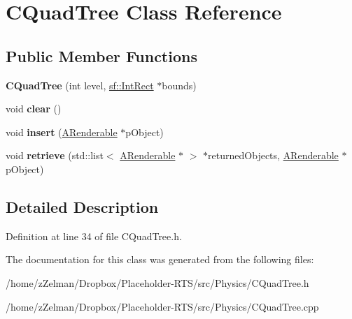 \hypertarget{classCQuadTree}{\section{C\-Quad\-Tree Class Reference}
\label{classCQuadTree}
}
\subsection*{Public Member Functions}
\begin{DoxyCompactItemize}
\item 
\hypertarget{classCQuadTree_a508176d23f4bcb255ca06bf70edce638}{{\bfseries C\-Quad\-Tree} (int level, \hyperlink{classsf_1_1Rect}{sf\-::\-Int\-Rect} $\ast$bounds)}\label{classCQuadTree_a508176d23f4bcb255ca06bf70edce638}

\item 
\hypertarget{classCQuadTree_ab4cf0e58d782f7674eae21a1e56fa6d2}{void {\bfseries clear} ()}\label{classCQuadTree_ab4cf0e58d782f7674eae21a1e56fa6d2}

\item 
\hypertarget{classCQuadTree_ac0ded7f002956e96269743dde8833cab}{void {\bfseries insert} (\hyperlink{classARenderable}{A\-Renderable} $\ast$p\-Object)}\label{classCQuadTree_ac0ded7f002956e96269743dde8833cab}

\item 
\hypertarget{classCQuadTree_a5bd034b9f4860bcaa4fdfc65391251eb}{void {\bfseries retrieve} (std\-::list$<$ \hyperlink{classARenderable}{A\-Renderable} $\ast$ $>$ $\ast$returned\-Objects, \hyperlink{classARenderable}{A\-Renderable} $\ast$p\-Object)}\label{classCQuadTree_a5bd034b9f4860bcaa4fdfc65391251eb}

\end{DoxyCompactItemize}


\subsection{Detailed Description}


Definition at line 34 of file C\-Quad\-Tree.\-h.



The documentation for this class was generated from the following files\-:\begin{DoxyCompactItemize}
\item 
/home/z\-Zelman/\-Dropbox/\-Placeholder-\/\-R\-T\-S/src/\-Physics/C\-Quad\-Tree.\-h\item 
/home/z\-Zelman/\-Dropbox/\-Placeholder-\/\-R\-T\-S/src/\-Physics/C\-Quad\-Tree.\-cpp\end{DoxyCompactItemize}
